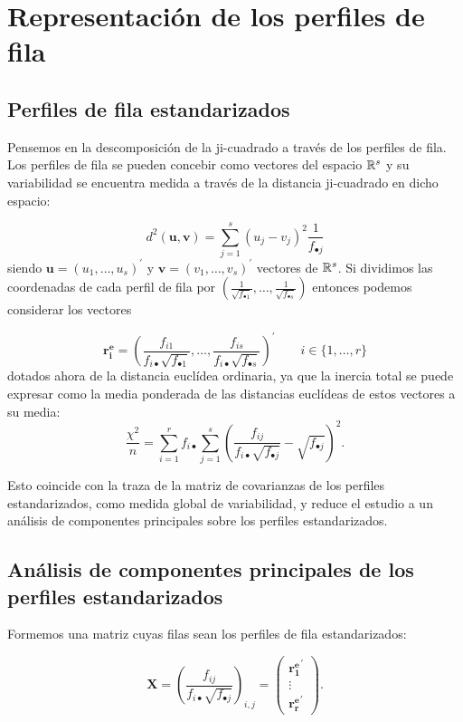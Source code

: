 \documentclass[
  a4paper,
  oneside]{scrbook}
\theoremstyle{definition}
\theoremstyle{definition}
\theoremstyle{definition}
\theoremstyle{definition}
\theoremstyle{remark}
\begin{document}
\section{Representación de los perfiles de fila}\label{representacion-de-los-perfiles-de-fila}

\subsection{Perfiles de fila estandarizados}\label{perfiles-de-fila-estandarizados}

Pensemos en la descomposición de la ji-cuadrado a través de los perfiles
de fila. Los perfiles de fila se pueden concebir como vectores del
espacio \({\Bbb R}^s\) y su variabilidad se encuentra medida a través de
la distancia ji-cuadrado en dicho espacio:

\[d^2(\bm{u},\bm{v})=\sum_{j=1}^s (u_j-v_j)^2 \frac{1}{f_{\bullet j}}\]
siendo \(\bm{u}=(u_1,\ldots,u_s)^\prime{}\) y
\(\bm{v}=(v_1,\ldots,v_s)^\prime{}\) vectores de \({\Bbb R}^s\). Si
dividimos las coordenadas de cada perfil de fila por
\(\left(\frac{1}{\sqrt{f_{\bullet 1}}},\ldots,\frac{1}{\sqrt{f_{\bullet s}}}\right)\)
entonces podemos considerar los vectores

\[\bm{r_i^e}=\left(\frac{f_{i1}}{f_{i\bullet}\sqrt{f_{\bullet 1}}},\ldots,
\frac{f_{is}}{f_{i\bullet}\sqrt{f_{\bullet s}}}\right)^\prime{} \qquad i\in \{1,\ldots,r\}\]
dotados ahora de la distancia euclídea ordinaria, ya que la inercia
total se puede expresar como la media ponderada de las distancias
euclídeas de estos vectores a su media: \[\frac{\chi^2}{n}
=\sum_{i=1}^r f_{i\bullet} \sum_{j=1}^s
\left(\frac{f_{ij}}{f_{i\bullet}\sqrt{f_{\bullet j}}}-\sqrt{f_{\bullet j}}\right)^2.\]

Esto coincide con la traza de la matriz de covarianzas de los perfiles
estandarizados, como medida global de variabilidad, y reduce el estudio
a un análisis de componentes principales sobre los perfiles
estandarizados.

\subsection{Análisis de componentes principales de los perfiles estandarizados}\label{analisis-de-componentes-principales-de-los-perfiles-estandarizados}

Formemos una matriz cuyas filas sean los perfiles de fila
estandarizados:

\[\bm{X}=\left(\frac{f_{ij}}{f_{i\bullet}\sqrt{f_{\bullet j}}}\right)_{i,j}
=\left(\begin{array}{c} {\bm{r_1^e}}^\prime{} \\ \vdots \\ {\bm{r_r^e}}^\prime{} \end{array}\right).\]
\end{document}
